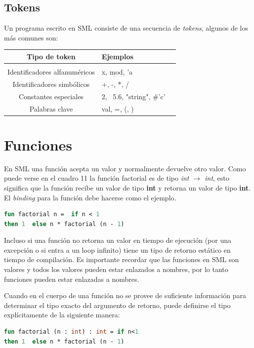 \documentclass[10pt,journal,compsoc]{IEEEtran}
\begin{document}
\subsection{Tokens}
Un programa escrito en SML consiste de una secuencia de \textit{tokens}, algunos de los m\'as comunes son:
\begin{tabular}{c p{3cm} p{5cm}}
	Tipo de token & Ejemplos\\
	\hline\hline\\
	Identificadores alfanum\'ericos & x, mod, 'a\\
	Identificadores simb\'olicos & +, -, *, /\\
	Constantes especiales & 2, ~5.6, "string", \#'c'\\
	Palabras clave & val, =, (, )\\
	\hline
\end{tabular}

\section{Funciones}
En SML una funci\'on acepta un valor y normalmente devuelve otro valor. Como puede verse en el cuadro 11 la funci\'on factorial es de tipo \textit{int $\rightarrow$ int}, esto significa que la funci\'on recibe un valor de tipo \textbf{int} y retorna un valor de tipo \textbf{int}. El \textit{binding} para la funci\'on debe hacerse como el ejemplo.

\begin{lstlisting}[language=ML, caption=Ejemplo Factorial]
fun factorial n =  if n < 1  
then 1  else n * factorial (n - 1)
\end{lstlisting}

Incluso si una funci\'on no retorna un valor en tiempo de ejecuci\'on (por una excepci\'on o si entra a un loop infinito) tiene un tipo de retorno est\'atico en tiempo de compilaci\'on. Es importante recordar que las funciones en SML son valores y todos los valores pueden estar enlazados a nombres, por lo tanto funciones pueden estar enlazadas a nombres.

Cuando en el cuerpo de una funci\'on no se provee de suficiente informaci\'on para determinar el tipo exacto del argumento de retorno, puede definirse el tipo expl\'icitamente de la siguiente manera:

\begin{lstlisting}[language=ML, caption=Ejemplo Factorial Tipo Expl\'icito]
fun factorial (n : int) : int = if n<1
then 1  else n * factorial (n - 1)
\end{lstlisting}
\end{document}
